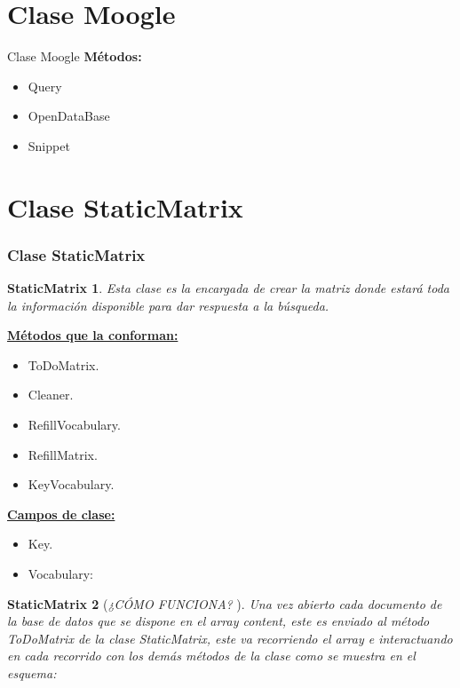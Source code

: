 \documentclass{beamer}
\newtheorem{teorema}{StaticMatrix}
\begin{document}
\section{Clase Moogle}
\begin{frame}{Clase Moogle} %
\vspace{-2.5cm}
  \textbf{Métodos:}
  \begin{itemize}
      \item Query
      \item OpenDataBase
      \item Snippet
    \end{itemize} 
\end{frame}

\section{Clase StaticMatrix} %
\begin{frame}
    \frametitle{Clase StaticMatrix}
    \vspace{-2.5cm}
    \begin{teorema} %
      Esta clase es la encargada de crear la matriz donde estará toda la información disponible para dar respuesta a la búsqueda.
    \end{teorema}

    \textbf{\underline{Métodos que la conforman: }} 
    \begin{itemize}
      \item ToDoMatrix.
      \item Cleaner.
      \item RefillVocabulary.
      \item RefillMatrix.
      \item KeyVocabulary.
    \end{itemize}
    

\end{frame}

\begin{frame}
  \vspace{-1cm}
  \textbf{\underline{Campos de clase: }} 
 
  \begin{itemize}
    \item Key.
    \item Vocabulary:
  \end{itemize}

    \begin{teorema}[\textit{¿CÓMO FUNCIONA? }]
      Una vez abierto cada documento de la base de datos que se dispone en el array content, este es enviado al método ToDoMatrix de la clase StaticMatrix, este va recorriendo el array e interactuando en cada recorrido con los demás métodos de la clase como se muestra en el esquema: 
    \end{teorema}

\end{frame}
\end{document}
